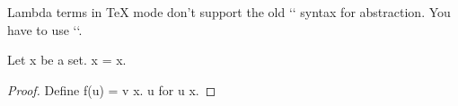 Lambda terms in TeX mode don't support the old `\x` syntax for abstraction.
You have to use `\fun`.

\begin{forthel}
  \begin{lemma}
    Let x be a set. x = x.
  \end{lemma}
  \begin{proof}
    Define f(u) = \fun v \in x. u for u \in x.
  \end{proof}
\end{forthel}